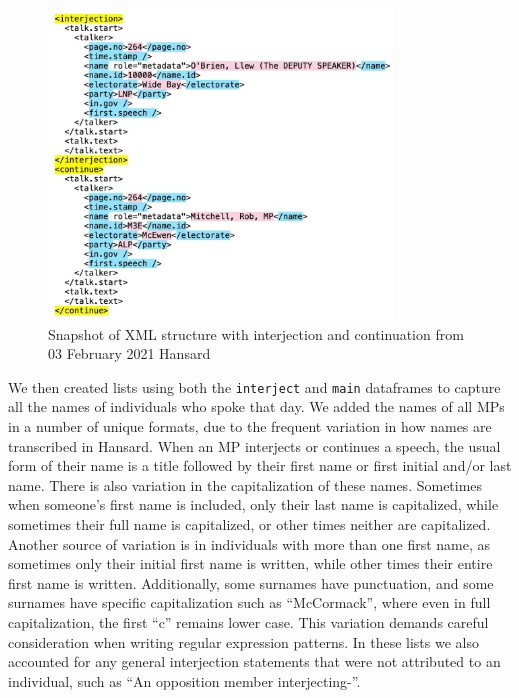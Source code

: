 \documentclass[
  letterpaper,
  DIV=11,
  numbers=noendperiod]{scrartcl}
\begin{document}
\begin{figure}

{\centering \includegraphics[width=3.59375in,height=\textheight]{xml2.jpg}

}

\caption{\label{fig-xml2}Snapshot of XML structure with interjection and
continuation from 03 February 2021 Hansard}

\end{figure}

We then created lists using both the \texttt{interject} and
\texttt{main} dataframes to capture all the names of individuals who
spoke that day. We added the names of all MPs in a number of unique
formats, due to the frequent variation in how names are transcribed in
Hansard. When an MP interjects or continues a speech, the usual form of
their name is a title followed by their first name or first initial
and/or last name. There is also variation in the capitalization of these
names. Sometimes when someone's first name is included, only their last
name is capitalized, while sometimes their full name is capitalized, or
other times neither are capitalized. Another source of variation is in
individuals with more than one first name, as sometimes only their
initial first name is written, while other times their entire first name
is written. Additionally, some surnames have punctuation, and some
surnames have specific capitalization such as ``McCormack'', where even
in full capitalization, the first ``c'' remains lower case. This
variation demands careful consideration when writing regular expression
patterns. In these lists we also accounted for any general interjection
statements that were not attributed to an individual, such as ``An
opposition member interjecting-''.
\end{document}
